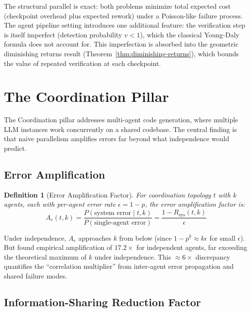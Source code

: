 \documentclass[11pt, a4paper, logo, copyright]{googledeepmind}
\newtheorem{definition}{Definition}[section]
\begin{document}
The structural parallel is exact: both problems minimize total expected cost (checkpoint overhead plus expected rework) under a Poisson-like failure process. The agent pipeline setting introduces one additional feature: the verification step is itself imperfect (detection probability $v < 1$), which the classical Young-Daly formula does not account for. This imperfection is absorbed into the geometric diminishing returns result (Theorem~\ref{thm:diminishing-returns}), which bounds the value of repeated verification at each checkpoint.
\section{The Coordination Pillar}
\label{sec:coordination}

The Coordination pillar addresses multi-agent code generation, where multiple LLM instances work concurrently on a shared codebase. The central finding is that naive parallelism amplifies errors far beyond what independence would predict.

\subsection{Error Amplification}

\begin{definition}[Error Amplification Factor]
\label{def:error-amp}
For coordination topology $t$ with $k$ agents, each with per-agent error rate $\epsilon = 1 - p$, the error amplification factor is:
\begin{equation}
    A_e(t, k) = \frac{P(\text{system error} \mid t, k)}{P(\text{single-agent error})} = \frac{1 - R_{\text{sys}}(t, k)}{\epsilon}
\end{equation}
\end{definition}

Under independence, $A_e$ approaches $k$ from below (since $1 - p^k \approx k\epsilon$ for small $\epsilon$). But \citet{kim2025scaling} found empirical amplification of $17.2\times$ for independent agents, far exceeding the theoretical maximum of $k$ under independence. This $\approx 6\times$ discrepancy quantifies the ``correlation multiplier'' from inter-agent error propagation and shared failure modes.

\subsection{Information-Sharing Reduction Factor}
\end{document}
